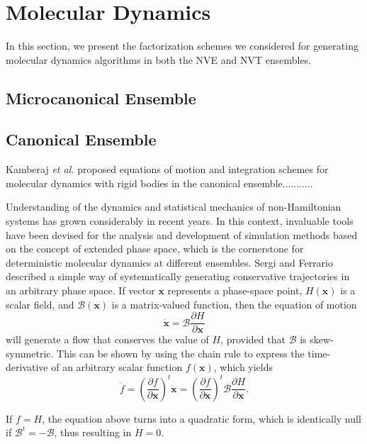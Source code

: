 \documentclass[aip,jcp,reprint,amsmath,amssymb,amsfont]{revtex4-1}
\newcommand{\vt}[1]{\boldsymbol{\mathbf{#1}}}           %
\newcommand{\tr}[1]{#1^t}                               %
\newcommand{\diff}[2]{\dfrac{\partial #1}{\partial #2}} %
\begin{document}
\section{Molecular Dynamics}
\label{sec:moleculardynamics}

In this section, we present the factorization schemes we considered for generating molecular dynamics algorithms in both the NVE and NVT ensembles.

\subsection{Microcanonical Ensemble}

\subsection{Canonical Ensemble}
\label{sec:canonical}

Kamberaj \textit{et al.}\cite{Kamberaj2005} proposed equations of motion and integration schemes for molecular dynamics with rigid bodies in the canonical ensemble...........

Understanding of the dynamics and statistical mechanics of non-Hamiltonian systems has grown considerably in recent years.\cite{Tuckerman_1999, Tuckerman2001, Sergi2001, Sergi2003, Ezra2004, Sergi2004, Ezra2006, Sergi2010b} In this context, invaluable tools have been devised for the analysis and development of simulation methods based on the concept of extended phase space, which is the cornerstone for deterministic molecular dynamics at different ensembles. Sergi and Ferrario\cite{Sergi2001} described a simple way of systematically generating conservative trajectories in an arbitrary phase space. If vector $\vt x$ represents a phase-space point, $H(\vt x)$ is a scalar field, and $\boldsymbol{\mathcal B}(\vt x)$ is a matrix-valued function, then the equation of motion
\begin{equation} \label{eq:eq_of_motion}
\dot{\vt x} = \boldsymbol{\mathcal B}\diff{H}{\vt x}
\end{equation}
will generate a flow that conserves the value of $H$, provided that $\boldsymbol{\mathcal B}$ is skew-symmetric. This can be shown by using the chain rule to express the time-derivative of an arbitrary scalar function $f(\vt x)$, which yields
\[
\dot{f} = \tr{\left(\diff{f}{\vt x}\right)}\dot{\vt x} = \tr{\left(\diff{f}{\vt x}\right)} \boldsymbol{ \mathcal B } \diff{H}{\vt x}.
\]

If $f = H$, the equation above turns into a quadratic form, which is identically null if $\tr{ \boldsymbol{ \mathcal B }} = -\boldsymbol{\mathcal B}$, thus resulting in $\dot H = 0$. 
\end{document}
